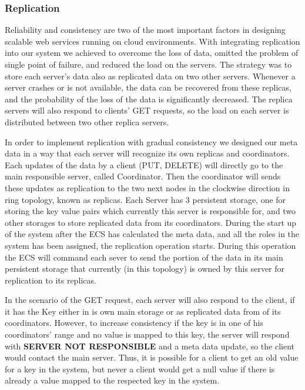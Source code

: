 \documentclass{sig-alternate}
\begin{document}
\subsubsection{Replication}
Reliability and consistency are two of the most important factors in designing scalable web services running on cloud environments. With integrating replication into our system we achieved to overcome the loss of data, omitted the problem of single point of failure, and reduced the load on the servers. The strategy was to store each server's data also as replicated data on two other servers. Whenever a server crashes or is not available, the data can be recovered from these replicas, and the probability of the loss of the data is  significantly decreased. The replica servers will also respond to clients' GET requests, so the load on each server is distributed between two other replica servers. 

In order to implement replication with gradual consistency we designed our meta data in a way that each server will recognize its own replicas and coordinators. Each updates of the data by a client (PUT, DELETE) will directly go to the main responsible server, called Coordinator. Then the coordinator will sends these updates as replication to the two next nodes in the clockwise direction in ring topology, known as replicas. Each Server has 3 persistent storage, one for storing the key value pairs which currently this server is responsible for, and two other storages to store replicated data from its coordinators. During the start up of the system after the ECS has calculated the meta data, and all the roles in the system has been assigned, the replication operation starts. During this operation the ECS will command each sever to send the portion of the data in its main persistent storage that currently (in this topology) is owned by this server for replication to its replicas.  

In the scenario of the GET request, each server will also respond to the client, if it has the Key either in is own main storage or as replicated data from of its coordinators. However, to increase consistency if the key is in one of his coordinators' range and no value is mapped to this key, the server will respond with \textbf{SERVER NOT RESPONSIBLE} and a meta data update, so the client would contact the main server. Thus, it is possible for a client to get an old value for a key in the system, but never a client would get a null value if there is already a value mapped to the respected key in the system.
\end{document}
